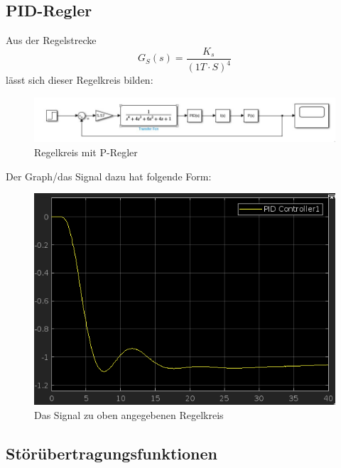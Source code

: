 \documentclass{article}
\begin{document}
		\subsection{PID-Regler}
			Aus der Regelstrecke 
			$$G_S(s) = \frac{K_s}{(1 T\cdot S)^4}$$
			lässt sich dieser Regelkreis bilden:
			\begin{figure}[h]
				\includegraphics[scale=0.6, center]{4_c_Blockschaltbild.png}
				\caption{Regelkreis mit P-Regler}
				\label{fig37: Blockschaltbild_PID_Regler}
			\end{figure}
			Der Graph/das Signal dazu hat folgende Form:
			\begin{figure}[h]
				\includegraphics[scale = 0.6, center]{4_c_Graph.png}
				\caption{Das Signal zu oben angegebenen Regelkreis}
				\label{fig38: 4_c_Graph}
			\end{figure}
\newpage
		\subsection{Störübertragungsfunktionen}
			
				
				
				
				
				
\end{document}
